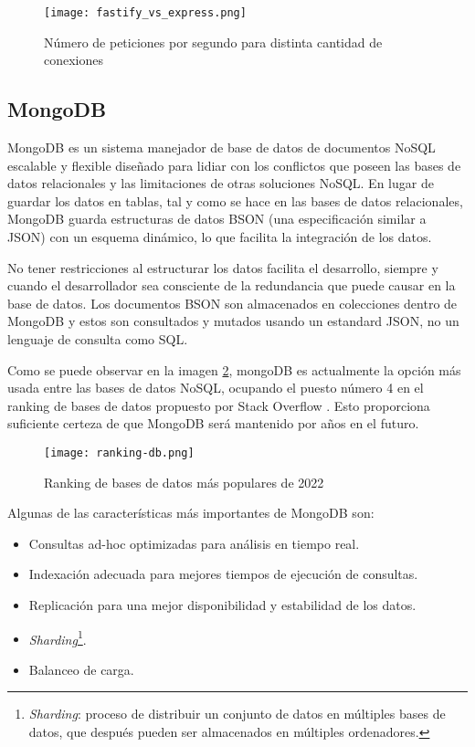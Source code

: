 \begin{figure}[H]
    \centering
    \texttt{[image: fastify\_vs\_express.png]}
    \caption{ Número de peticiones por segundo para distinta cantidad de conexiones}
    \label{fig:fastify_vs_express}
\end{figure}

\subsection{MongoDB}

MongoDB es un sistema manejador de base de datos de documentos NoSQL escalable y flexible diseñado para lidiar con los conflictos que poseen las bases de datos relacionales y las limitaciones de otras soluciones NoSQL. En lugar de guardar los datos en tablas, tal y como se hace en las bases de datos relacionales, MongoDB guarda estructuras de datos BSON (una especificación similar a JSON) con un esquema dinámico, lo que facilita la integración de los datos.

No tener restricciones al estructurar los datos facilita el desarrollo, siempre y cuando el desarrollador sea consciente de la redundancia que puede causar en la base de datos. Los documentos BSON son almacenados en colecciones dentro de MongoDB y estos son consultados y mutados usando un estandard JSON, no un lenguaje de consulta como SQL.

Como se puede observar en la imagen \ref{fig:ranking-db}, mongoDB es actualmente la opción más usada entre las bases de datos NoSQL, ocupando el puesto número 4 en el ranking de bases de datos propuesto por Stack Overflow \cite{StackOverflowSurvey}. Esto proporciona suficiente certeza de que MongoDB será mantenido por años en el futuro.

\begin{figure}[H]
    \centering
    \texttt{[image: ranking-db.png]}
    \caption{Ranking de bases de datos más populares de 2022}
    \label{fig:ranking-db}
\end{figure}

Algunas de las características más importantes de MongoDB son:

\begin{itemize}
  \item Consultas ad-hoc optimizadas para análisis en tiempo real.
  \item Indexación adecuada para mejores tiempos de ejecución de consultas.
  \item Replicación para una mejor disponibilidad y estabilidad de los datos.
  \item \textit{Sharding}\footnote{\textit{Sharding}: proceso de distribuir un conjunto de datos en múltiples bases de datos, que después pueden ser almacenados en múltiples ordenadores.}.
  \item Balanceo de carga.
\end{itemize}

